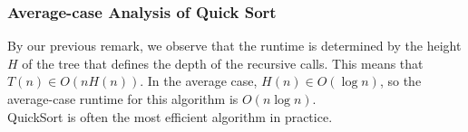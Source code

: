 \documentclass{report}
\begin{document}
\subsubsection{Average-case Analysis of Quick Sort}
By our previous remark, we observe that the runtime is determined by the height $H$ of the tree that defines the depth of the recursive calls. This means that $T(n) \in O(n H(n))$. In the average case, $H(n) \in O(\log n)$, so the average-case runtime for this algorithm is $O(n \log n)$.\\
QuickSort is often the most efficient algorithm in practice.
\end{document}
